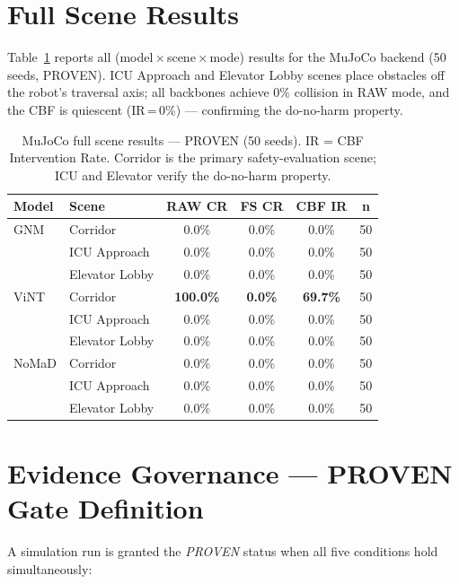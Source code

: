 \documentclass[letterpaper]{article}
\newcommand{\proven}[1]{\textcolor{ProvenGreen}{\textbf{#1}}}
\newcommand{\danger}[1]{\textcolor{DangerRed}{\textbf{#1}}}
\newcommand{\cbf}[1]{\textcolor{CbfAmber}{\textbf{#1}}}
\begin{document}
\clearpage
\appendix
\section{Full Scene Results}
\label{app:fullscene}

Table~\ref{tab:full} reports all (model\,×\,scene\,×\,mode) results for the
MuJoCo backend (50 seeds, PROVEN). ICU Approach and Elevator Lobby scenes
place obstacles off the robot's traversal axis; all backbones achieve 0\%
collision in RAW mode, and the CBF is quiescent (IR\,=\,0\%) — confirming
the do-no-harm property.

\begin{table}[htbp]
\centering
\caption{MuJoCo full scene results — PROVEN (50 seeds). IR = CBF Intervention Rate.
         Corridor is the primary safety-evaluation scene; ICU and Elevator verify
         the do-no-harm property.}
\label{tab:full}
\setlength{\tabcolsep}{4pt}
\begin{tabular}{llcccc}
\toprule
Model & Scene & RAW CR & FS CR & CBF IR & n \\
\midrule
GNM   & Corridor       & 0.0\%  & 0.0\% & 0.0\%  & 50 \\
      & ICU Approach   & 0.0\%  & 0.0\% & 0.0\%  & 50 \\
      & Elevator Lobby & 0.0\%  & 0.0\% & 0.0\%  & 50 \\
\midrule
ViNT  & Corridor       & \danger{100.0\%}  & \proven{0.0\%} & \cbf{69.7\%} & 50 \\
      & ICU Approach   & 0.0\%  & 0.0\% & 0.0\%  & 50 \\
      & Elevator Lobby & 0.0\%  & 0.0\% & 0.0\%  & 50 \\
\midrule
NoMaD & Corridor       & 0.0\%  & 0.0\% & 0.0\%  & 50 \\
      & ICU Approach   & 0.0\%  & 0.0\% & 0.0\%  & 50 \\
      & Elevator Lobby & 0.0\%  & 0.0\% & 0.0\%  & 50 \\
\bottomrule
\end{tabular}
\end{table}

\section{Evidence Governance — PROVEN Gate Definition}
\label{app:proven_gate}

A simulation run is granted the \emph{PROVEN} status when all five conditions
hold simultaneously:
\end{document}
